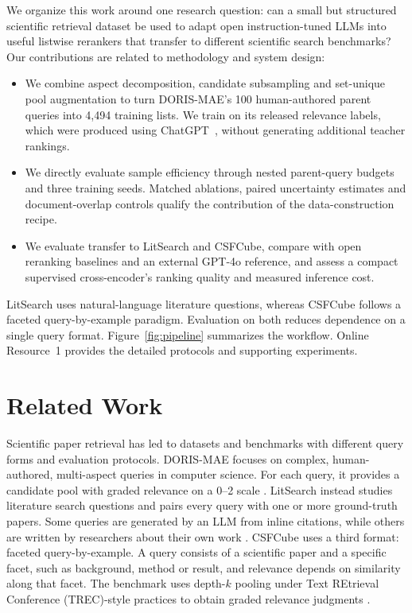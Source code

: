 \documentclass[pdflatex,sn-basic,Numbered]{sn-jnl}%
\theoremstyle{thmstyleone}%
\theoremstyle{thmstyletwo}%
\theoremstyle{thmstylethree}%
\begin{document}
We organize this work around one research question: can a small but structured
scientific retrieval dataset be used to adapt open instruction-tuned LLMs into
useful listwise rerankers that transfer to different scientific search benchmarks?
Our contributions are related to methodology and system design:
\begin{itemize}
\item We combine aspect decomposition, candidate subsampling and set-unique pool
augmentation to turn DORIS-MAE's 100 human-authored parent queries into 4,494
training lists. We train on its released relevance labels, which were produced
using ChatGPT~\cite{Wang}, without generating additional teacher rankings.
\item We directly evaluate sample efficiency through nested parent-query budgets
and three training seeds. Matched ablations, paired uncertainty estimates and
document-overlap controls qualify the contribution of the data-construction recipe.
\item We evaluate transfer to LitSearch and CSFCube, compare with open reranking
baselines and an external GPT-4o reference, and assess a compact supervised
cross-encoder's ranking quality and measured inference cost.
\end{itemize}
LitSearch uses natural-language literature questions, whereas CSFCube follows a
faceted query-by-example paradigm. Evaluation on both reduces dependence on a
single query format. Figure~\ref{fig:pipeline} summarizes the workflow. 
Online
Resource~1 provides the detailed protocols and supporting experiments.

\section{Related Work}

Scientific paper retrieval has led to datasets and benchmarks with different query
forms and evaluation protocols. DORIS-MAE focuses on complex, human-authored,
multi-aspect queries in computer science. For each query, it provides a candidate
pool with graded relevance on a 0--2 scale \cite{Wang}. LitSearch instead studies
literature search questions and pairs every query with one or more ground-truth
papers. Some queries are generated by an LLM from inline citations, while others
are written by researchers about their own work \cite{Ajith}. CSFCube uses a third
format: faceted query-by-example. A query consists of a scientific paper and a
specific facet, such as background, method or result, and relevance depends on
similarity along that facet. The benchmark uses depth-$k$ pooling under
Text REtrieval Conference (TREC)-style practices to obtain graded relevance judgments \cite{Mysore}.
\end{document}
